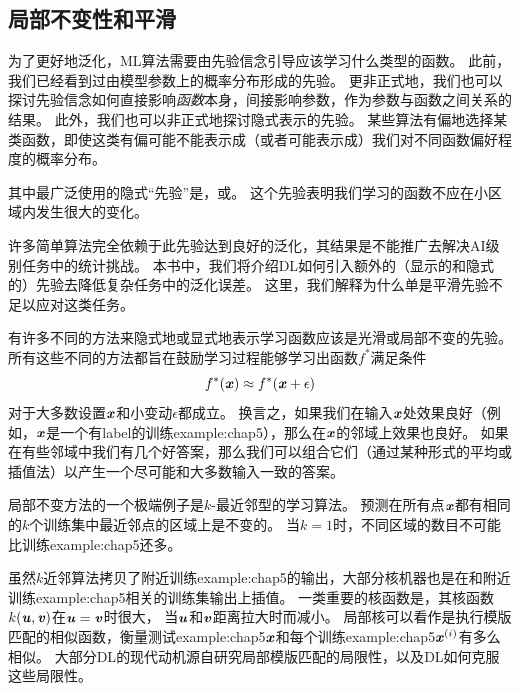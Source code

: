 
\subsection{局部不变性和平滑}
\label{sec:local_constancy_and_smoothness_regularization}
为了更好地泛化，\gls{ML}算法需要由先验信念引导应该学习什么类型的函数。
此前，我们已经看到过由模型参数上的概率分布形成的先验。
更非正式地，我们也可以探讨先验信念如何直接影响\emph{函数}本身，间接影响参数，作为参数与函数之间关系的结果。 
此外，我们也可以非正式地探讨隐式表示的先验。
某些算法有偏地选择某类函数，即使这类有偏可能不能表示成（或者可能表示成）我们对不同函数偏好程度的概率分布。


其中最广泛使用的隐式“先验”是，或。
这个先验表明我们学习的函数不应在小区域内发生很大的变化。

许多简单算法完全依赖于此先验达到良好的泛化，其结果是不能推广去解决\gls{AI}级别任务中的统计挑战。
本书中，我们将介绍\gls{DL}如何引入额外的（显示的和隐式的）先验去降低复杂任务中的泛化误差。
这里，我们解释为什么单是平滑先验不足以应对这类任务。

有许多不同的方法来隐式地或显式地表示学习函数应该是光滑或局部不变的先验。
所有这些不同的方法都旨在鼓励学习过程能够学习出函数$f^*$满足条件
\begin{equation}
    f^*(\boldsymbol{\mathit{x}}) \approx f^*(\boldsymbol{\mathit{x}} + \epsilon)
\end{equation}
对于大多数设置$\boldsymbol{\mathit{x}}$和小变动$\epsilon$都成立。
换言之，如果我们在输入$\boldsymbol{\mathit{x}}$处效果良好（例如，$\boldsymbol{\mathit{x}}$是一个有\gls{label}的训练\gls{example:chap5}），那么在$\boldsymbol{\mathit{x}}$的邻域上效果也良好。
如果在有些邻域中我们有几个好答案，那么我们可以组合它们（通过某种形式的平均或插值法）以产生一个尽可能和大多数输入一致的答案。

局部不变方法的一个极端例子是$k$-最近邻型的学习算法。
预测在所有点$\boldsymbol{\mathit{x}}$都有相同的$k$个训练集中最近邻点的区域上是不变的。
当$k=1$时，不同区域的数目不可能比训练\gls{example:chap5}还多。

虽然$k$近邻算法拷贝了附近训练\gls{example:chap5}的输出，大部分核机器也是在和附近训练\gls{example:chap5}相关的训练集输出上插值。
一类重要的核函数是，其核函数$k(\boldsymbol{\mathit{u}},\boldsymbol{\mathit{v}})$在$\boldsymbol{\mathit{u}}=\boldsymbol{\mathit{v}}$时很大，
当$\boldsymbol{\mathit{u}}$和$\boldsymbol{\mathit{v}}$距离拉大时而减小。
局部核可以看作是执行模版匹配的相似函数，衡量测试\gls{example:chap5}$\boldsymbol{\mathit{x}}$和每个训练\gls{example:chap5}$\boldsymbol{\mathit{x}}^{(i)}$有多么相似。
大部分\gls{DL}的现代动机源自研究局部模版匹配的局限性，以及\gls{DL}如何克服这些局限性\citep{NIPS2005_424}。


